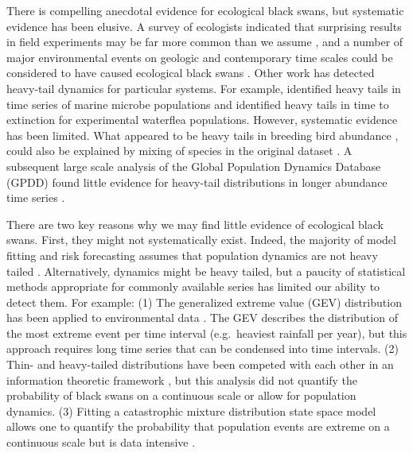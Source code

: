There is compelling anecdotal evidence for ecological black swans, but
systematic evidence has been elusive. A survey of ecologists indicated that
surprising results in field experiments may be far more common than we assume
\citep{doak2008}, and a number of major environmental events on geologic and
contemporary time scales could be considered to have caused ecological black
swans \citep{nunez2012}. Other work has detected heavy-tail dynamics for
particular systems. For example, \citet{segura2013} identified heavy tails in
time series of marine microbe populations and \citet{drake2014} identified
heavy tails in time to extinction for experimental waterflea populations.
However, systematic evidence has been limited. What appeared to be heavy tails
in breeding bird abundance \citep{keitt1998}, could also be explained by 
mixing of species in the original dataset \citep{allen2001}. A subsequent
large scale analysis of the Global Population Dynamics Database (GPDD) found
little evidence for heavy-tail distributions in longer abundance time series
\citet{halley2002}.

There are two key reasons why we may find little evidence of ecological black
swans. First, they might not systematically exist. Indeed, the majority of
model fitting and risk forecasting assumes that population dynamics are not
heavy tailed \citep[e.g.][]{brook2006a,dennis2006,knape2012}. Alternatively,
dynamics might be heavy tailed, but a paucity of statistical methods
appropriate for commonly available series has limited our ability to detect
them. For example: (1) The generalized extreme value (GEV) distribution has
been applied to environmental data \citep[e.g.][]{katz2005}. The GEV describes
the distribution of the most extreme event per time interval (e.g.~heaviest
rainfall per year), but this approach requires long time series that can be
condensed into time intervals. (2) Thin- and heavy-tailed distributions have
been competed with each other in an information theoretic framework
\citep{halley2002}, but this analysis did not quantify the probability of
black swans on a continuous scale or allow for population dynamics. (3) Fitting
a catastrophic mixture distribution state space model allows one to quantify
the probability that population events are extreme on a continuous scale
but is data intensive \citep{ward2007}.

